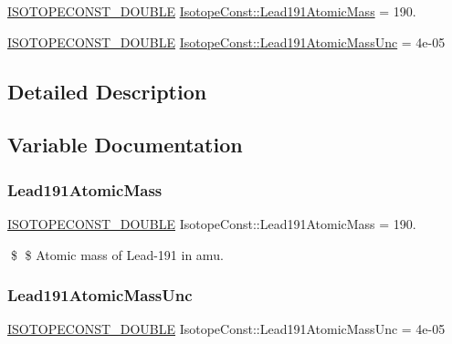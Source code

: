 \begin{DoxyCompactItemize}
\item 
\mbox{\hyperlink{group___isotope_const-_macros_ga8f45a7272ce02c0b4c65c44636ed719a}{I\+S\+O\+T\+O\+P\+E\+C\+O\+N\+S\+T\+\_\+\+D\+O\+U\+B\+LE}} \mbox{\hyperlink{group___isotope_const-_lead-_pb191_ga9f5873fd433f18fa9478fb25c8fe3773}{Isotope\+Const\+::\+Lead191\+Atomic\+Mass}} = 190.
\item 
\mbox{\hyperlink{group___isotope_const-_macros_ga8f45a7272ce02c0b4c65c44636ed719a}{I\+S\+O\+T\+O\+P\+E\+C\+O\+N\+S\+T\+\_\+\+D\+O\+U\+B\+LE}} \mbox{\hyperlink{group___isotope_const-_lead-_pb191_gad5f163bf916ba912560d5b42bcb61188}{Isotope\+Const\+::\+Lead191\+Atomic\+Mass\+Unc}} = 4e-\/05
\end{DoxyCompactItemize}


\subsection{Detailed Description}


\subsection{Variable Documentation}
\mbox{\label{group___isotope_const-_lead-_pb191_ga9f5873fd433f18fa9478fb25c8fe3773}} 
\subsubsection{\texorpdfstring{Lead191\+Atomic\+Mass}{Lead191AtomicMass}}
{\footnotesize\ttfamily \mbox{\hyperlink{group___isotope_const-_macros_ga8f45a7272ce02c0b4c65c44636ed719a}{I\+S\+O\+T\+O\+P\+E\+C\+O\+N\+S\+T\+\_\+\+D\+O\+U\+B\+LE}} Isotope\+Const\+::\+Lead191\+Atomic\+Mass = 190.}

\$ \$ Atomic mass of Lead-\/191 in amu. \mbox{\label{group___isotope_const-_lead-_pb191_gad5f163bf916ba912560d5b42bcb61188}} 
\subsubsection{\texorpdfstring{Lead191\+Atomic\+Mass\+Unc}{Lead191AtomicMassUnc}}
{\footnotesize\ttfamily \mbox{\hyperlink{group___isotope_const-_macros_ga8f45a7272ce02c0b4c65c44636ed719a}{I\+S\+O\+T\+O\+P\+E\+C\+O\+N\+S\+T\+\_\+\+D\+O\+U\+B\+LE}} Isotope\+Const\+::\+Lead191\+Atomic\+Mass\+Unc = 4e-\/05}

